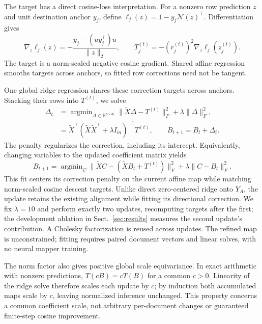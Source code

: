 The target has a direct cosine-loss interpretation. For a nonzero row
prediction $z$ and unit destination anchor $y_j$, define
$\ell_j(z)=1-y_j\mathcal N(z)^\top$. Differentiation gives
\begin{equation}
 \nabla_z\ell_j(z)=-\frac{y_j-(uy_j^\top)u}{\|z\|_2},
 \qquad T_j^{(t)}=-(r_j^{(t)})^2\nabla_z\ell_j(z_j^{(t)}).
 \label{eq:cosine-target}
\end{equation}
The target is a norm-scaled negative cosine gradient. Shared affine regression
smooths targets across anchors, so fitted row corrections need not be tangent.

One global ridge regression shares these correction targets across anchors.
Stacking their rows into $T^{(t)}$, we solve
\begin{align}
 \Delta_t&=\mathop{\arg\min}_{\Delta\in\mathbb{R}^{p\times d_t}}
 \|\widetilde{X}\Delta-T^{(t)}\|_F^2+\lambda\|\Delta\|_F^2,
 \label{eq:ridge-objective}\\
 &=\widetilde{X}^{\top}
 (\widetilde{X}\widetilde{X}^{\top}+\lambda I_m)^{-1}T^{(t)},
 \qquad B_{t+1}=B_t+\Delta_t .
 \label{eq:tangent-update}
\end{align}
The penalty regularizes the correction, including its intercept. Equivalently,
changing variables to the updated coefficient matrix yields
\begin{equation}
 B_{t+1}=\mathop{\arg\min}_C
 \|\widetilde X C-(\widetilde X B_t+T^{(t)})\|_F^2
 +\lambda\|C-B_t\|_F^2.
 \label{eq:current-prior}
\end{equation}
This fit centers its correction penalty on the current affine map while
matching norm-scaled cosine descent targets. Unlike direct
zero-centered ridge onto $Y_A$, the update retains the existing alignment
while fitting its directional correction. We fix $\lambda=10$ and perform
exactly two updates, recomputing targets after the first; the development
ablation in Sect.~\ref{sec:results} measures the second update's contribution.
A Cholesky
factorization is reused across updates. The refined map is unconstrained;
fitting requires paired document vectors and linear solves, with no neural
mapper training.

The norm factor also gives positive global scale equivariance. In exact
arithmetic with nonzero predictions, $T(cB)=cT(B)$ for a common $c>0$.
Linearity of the ridge solve therefore scales each update by $c$; by
induction both accumulated maps scale by $c$, leaving normalized inference
unchanged. This property concerns a common coefficient scale, not arbitrary
per-document changes or guaranteed finite-step cosine improvement.


